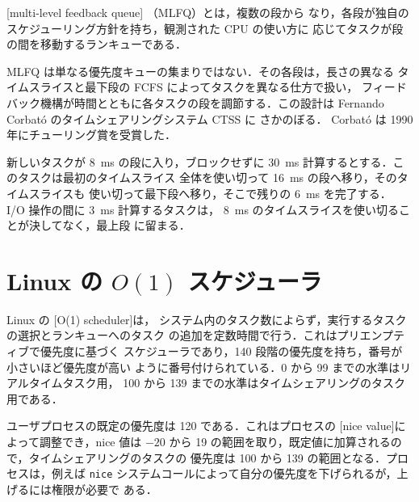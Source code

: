 \documentclass[../main.tex]{subfiles}
\begin{document}
\begin{definition}[多段フィードバックキュー]
  [multi-level feedback queue]%
  （MLFQ）とは，複数の段から
  なり，各段が独自のスケジューリング方針を持ち，観測された CPU の使い方に
  応じてタスクが段の間を移動するランキューである．
\end{definition}

MLFQ は単なる優先度キューの集まりではない．その各段は，長さの異なる
タイムスライスと最下段の FCFS によってタスクを異なる仕方で扱い，
フィードバック機構が時間とともに各タスクの段を調節する．この設計は
Fernando Corbató のタイムシェアリングシステム CTSS \cite{corbato1962} に
さかのぼる．
Corbató は 1990 年にチューリング賞を受賞した．

\begin{example}
  新しいタスクが \SI{8}{\milli\second} の段に入り，ブロックせずに
  \SI{30}{\milli\second} 計算するとする．このタスクは最初のタイムスライス
  全体を使い切って \SI{16}{\milli\second} の段へ移り，そのタイムスライスも
  使い切って最下段へ移り，そこで残りの \SI{6}{\milli\second} を完了する．
  I/O 操作の間に \SI{3}{\milli\second} 計算するタスクは，
  \SI{8}{\milli\second} のタイムスライスを使い切ることが決してなく，最上段
  に留まる．
\end{example}

\section{Linux の $O(1)$ スケジューラ}
\label{sec:l07-o1}

Linux の [O(1) scheduler]は，
システム内のタスク数によらず，実行するタスクの選択とランキューへのタスク
の追加を定数時間で行う．これはプリエンプティブで優先度に基づく
スケジューラであり，140 段階の優先度を持ち，番号が小さいほど優先度が高い
ように番号付けられている．0 から 99 までの水準はリアルタイムタスク用，
100 から 139 までの水準はタイムシェアリングのタスク用である．

ユーザプロセスの既定の優先度は 120 である．これはプロセスの
[nice value]によって調整でき，nice 値は $-20$ から
19 の範囲を取り，既定値に加算されるので，タイムシェアリングのタスクの
優先度は 100 から 139 の範囲となる．プロセスは，例えば \texttt{nice}
システムコールによって自分の優先度を下げられるが，上げるには権限が必要で
ある．
\end{document}

